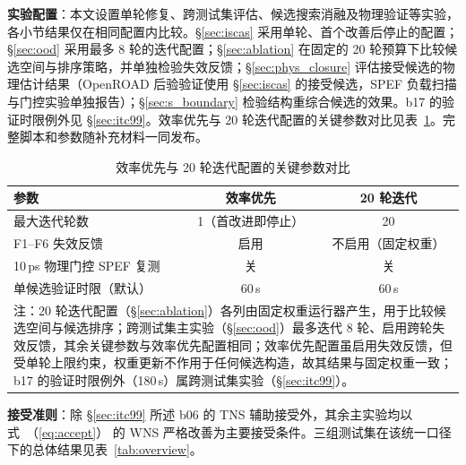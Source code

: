 \documentclass[twocolumn,10pt,fontset=windows]{ctexart}
\renewcommand{\eqref}[1]{\textup{（\ref{#1}）}}
\begin{document}
\textbf{实验配置}：本文设置单轮修复、跨测试集评估、候选搜索消融及物理验证等实验，各小节结果仅在相同配置内比较。\S\ref{sec:iscas} 采用单轮、首个改善后停止的配置；\S\ref{sec:ood} 采用最多 8 轮的迭代配置；\S\ref{sec:ablation} 在固定的 20 轮预算下比较候选空间与排序策略，并单独检验失效反馈；\S\ref{sec:phys_closure} 评估接受候选的物理估计结果（OpenROAD 后验验证使用 \S\ref{sec:iscas} 的接受候选，SPEF 负载扫描与门控实验单独报告）；\S\ref{sec:s_boundary} 检验结构重综合候选的效果。b17 的验证时限例外见 \S\ref{sec:itc99}。效率优先与 20 轮迭代配置的关键参数对比见表~\ref{tab:configs}。完整脚本和参数随补充材料一同发布。

\begin{table}[!htb]
\centering
\caption{效率优先与 20 轮迭代配置的关键参数对比}
\label{tab:configs}
\scriptsize
\setlength{\tabcolsep}{4pt}
\begin{tabular}{lcc}
\toprule
\textbf{参数} & \textbf{效率优先} & \textbf{20 轮迭代} \\
\midrule
最大迭代轮数                    & 1（首改进即停止） & 20 \\
F1--F6 失效反馈                  & 启用 & 不启用（固定权重） \\
10\,ps 物理门控 SPEF 复测        & 关 & 关 \\
单候选验证时限（默认）           & 60\,s & 60\,s \\
\bottomrule
\multicolumn{3}{p{0.95\columnwidth}}{\footnotesize 注：20 轮迭代配置（\S\ref{sec:ablation}）各列由固定权重运行器产生，用于比较候选空间与候选排序；跨测试集主实验（\S\ref{sec:ood}）最多迭代 8 轮、启用跨轮失效反馈，其余关键参数与效率优先配置相同；效率优先配置虽启用失效反馈，但受单轮上限约束，权重更新不作用于任何候选构造，故其结果与固定权重一致；b17 的验证时限例外（180\,s）属跨测试集实验（\S\ref{sec:itc99}）。}\\
\end{tabular}
\end{table}

\textbf{接受准则}：除 \S\ref{sec:itc99} 所述 b06 的 TNS 辅助接受外，其余主实验均以式~\eqref{eq:accept} 的 WNS 严格改善为主要接受条件。三组测试集在该统一口径下的总体结果见表~\ref{tab:overview}。
\end{document}
